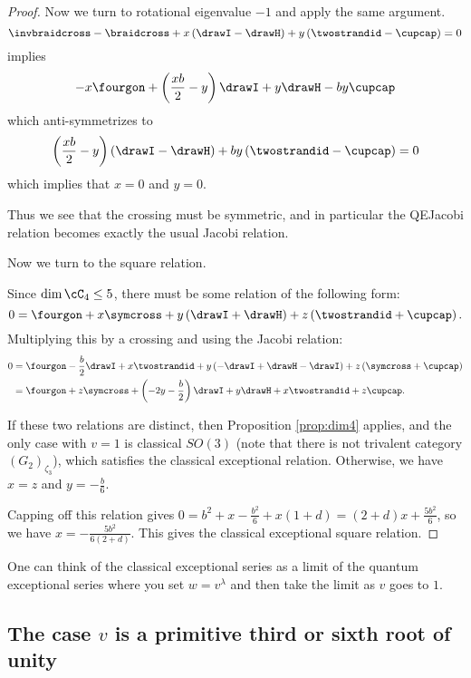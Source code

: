 \documentclass[12pt]{amsart}
\begin{document}
\begin{proof}
Now we turn to rotational eigenvalue $-1$ and apply the same argument.
\[\invbraidcross - \braidcross + x\left(\drawI - \drawH\right) + y \left(\twostrandid-\cupcap\right)=0\] implies
\[-x \fourgon + \left(\frac{xb}{2} -y\right) \drawI + y \drawH - b y \cupcap\] which anti-symmetrizes to
\[\left(\frac{xb}{2}-y\right) \left(\drawI - \drawH\right) + b y \left(\twostrandid - \cupcap\right) = 0\]
which implies that $x = 0$ and $y=0$.

Thus we see that the crossing must be symmetric, and in particular the QEJacobi relation becomes exactly the usual Jacobi relation.

Now we turn to the square relation.

Since $\dim \cC_4 \leq 5$, there must be some relation of the following form:
$$0 = \fourgon + x \symcross + y \left(\drawI + \drawH \right) + z\left(\twostrandid + \cupcap \right).$$
Multiplying this by a crossing and using the Jacobi relation:
\begin{align*}
0 &= \fourgon - \frac{b}{2} \drawI + x \twostrandid + y \left(-\drawI + \drawH -\drawI \right) + z\left(\symcross + \cupcap \right) 
\\ &= \fourgon + z \symcross + \left(-2y -\frac{b}{2} \right) \drawI +y \drawH +x \twostrandid + z\cupcap. 
\end{align*}

If these two relations are distinct, then Proposition \ref{prop:dim4} applies, and the only case with $v=1$ is classical $SO(3)$ (note that there is not trivalent category $(G_2)_{\zeta_3}$), which satisfies the classical exceptional relation.  Otherwise, we have $x=z$ and $y = -\frac{b}{6}$.  

Capping off this relation gives $0 = b^2 + x -\frac{b^2}{6}+x(1+d) =  (2+d)x +\frac{5 b^2}{6}$, so we have $x = -\frac{5 b^2}{6(2+d)}$.  This gives the classical exceptional square relation.
\end{proof}

\begin{remark}
One can think of the classical exceptional series as a limit of the quantum exceptional series where you set $w = v^\lambda$ and then take the limit as $v$ goes to $1$.
\end{remark}

\subsection{The case \texorpdfstring{$v$}{v} is a primitive third or sixth root of unity}
\end{document}
